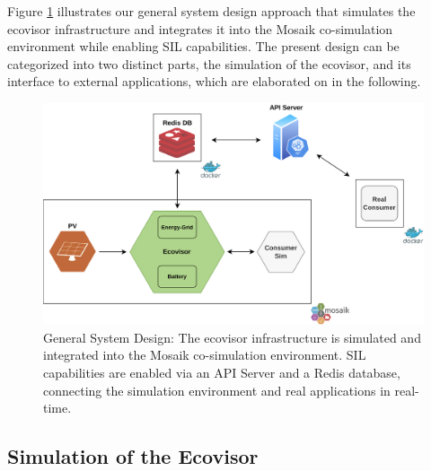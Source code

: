
Figure \ref{fig:system_design} illustrates our general system design approach
that simulates the ecovisor infrastructure and integrates it into the Mosaik
co-simulation environment while enabling SIL capabilities. The present design
can be categorized into two distinct parts, the simulation of the ecovisor, and
its interface to external applications, which are elaborated on in the
following.

\begin{figure}
    \centering
    \includegraphics[width=\linewidth]{figures/system_design}
    \caption{
        General System Design: The ecovisor infrastructure is simulated and
        integrated into the Mosaik co-simulation environment. SIL capabilities
        are enabled via an API Server and a Redis database, connecting the
        simulation environment and real applications in real-time.
    }
    \label{fig:system_design}
\end{figure}

\subsection{Simulation of the Ecovisor}
%
%
%
%
%

